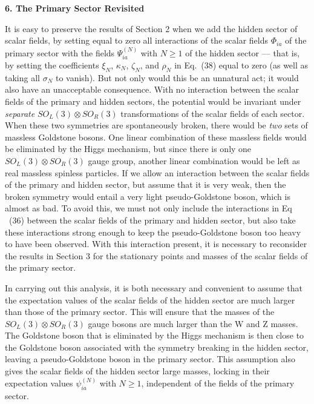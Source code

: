 \documentclass[12pt]{article}
\begin{document}
\begin{center}
{\bf 6.  The Primary Sector Revisited}
\end{center}

It is easy to  preserve  the results of Section 2 when we add the hidden sector of scalar fields, by setting equal to zero all interactions of the scalar fields $\Phi_{ia}$ of the primary sector with the fields $\Psi^{(N)}_{ia}$ with $N\geq 1$ of the hidden sector --- that is, by setting the coefficients $\xi_N$, $\kappa_N$, $\zeta_N$, and $\rho_N$ in Eq.~(38) equal to zero (as well as taking all $\sigma_{N}$ to vanish).  But not only would this be an unnatural act; it would also have an unacceptable consequence.  With no interaction between the scalar fields of the primary and hidden sectors, the potential would be invariant under  {\em separate}   $SO_L(3)\otimes SO_R(3)$ transformations of the scalar fields of each sector.  When these two symmetries are spontaneously broken, there would be {\em two} sets of massless Goldstone bosons.  One linear combination of these massless fields would be eliminated by the Higgs mechanism, but since there is only one $SO_L(3)\otimes SO_R(3)$ gauge group, another linear combination would be left  as real massless spinless particles.  If we allow an interaction between the scalar fields of the primary and hidden sector, but assume that it is very weak, then the broken symmetry would entail a very light pseudo-Goldstone boson, which is almost as bad.  To avoid this, we must not only include the interactions in Eq ~(36) between the scalar fields of the primary and hidden sector, but also take these interactions strong enough to keep the pseudo-Goldstone boson too heavy to have been observed.  With this interaction present, it is necessary to reconsider the results in Section 3 for  the stationary points and masses of the scalar fields of the primary sector.

In carrying out this analysis, it is both necessary and convenient to assume that the expectation values of the scalar fields of the hidden sector are much larger than those of the primary sector.  This will ensure that the masses of the $SO_L(3)\otimes SO_R(3)$ gauge bosons are much larger than the W and Z masses.  The Goldstone boson that is eliminated by the Higgs mechanism is then close to the Goldstone boson associated with the symmetry breaking in the hidden sector, leaving a pseudo-Goldstone boson in the primary sector.  This assumption also gives the scalar fields of the hidden sector large masses, locking in their expectation values $\psi^{(N)}_{ia}$ with $N\geq 1$, independent of the fields of the primary sector.  
\end{document}

